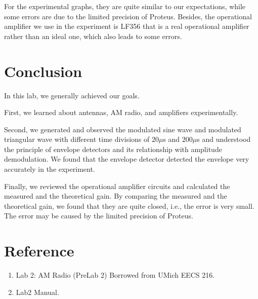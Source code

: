 \documentclass[a4paper]{article}
\begin{document}
For the experimental graphs, they are quite similar to our expectations, while some errors are due to the limited precision of Proteus. Besides, the operational amplifier we use in the experiment is LF356 that is a real operational amplifier rather than an ideal one, which also leads to some errors.
\section{Conclusion}
In this lab, we generally achieved our goals.

First, we learned about antennas, AM radio, and amplifiers experimentally.

Second, we generated and observed the modulated sine wave and modulated triangular wave with different time divisions of $20\mu$s and $200\mu$s and understood the principle of envelope detectors and its relationship with amplitude demodulation. We found that the envelope detector detected the envelope very accurately in the experiment.

Finally, we reviewed the operational amplifier circuits and calculated the measured and the theoretical gain. By comparing the measured and the theoretical gain, we found that they are quite closed, i.e., the error is very small. The error may be caused by the limited precision of Proteus.
\section{Reference}
\begin{enumerate}
	\item Lab 2: AM Radio (PreLab 2) Borrowed from UMich EECS 216.
	\item Lab2 Manual.
\end{enumerate}
\end{document}
